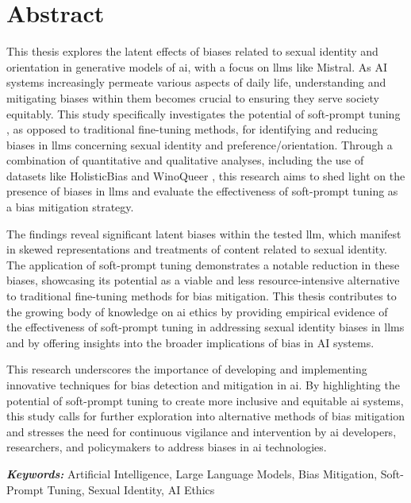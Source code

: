 

\section*{Abstract}
This thesis explores the latent effects of biases related to sexual identity and orientation in generative models of \acrfull{ai}, with a focus on \acrfull{llms} like Mistral. As AI systems increasingly permeate various aspects of daily life, understanding and mitigating biases within them becomes crucial to ensuring they serve society equitably. This study specifically investigates the potential of soft-prompt tuning \citep{prompt-tuning}, as opposed to traditional fine-tuning methods, for identifying and reducing biases in \acrshort{llms} concerning sexual identity and preference/orientation. Through a combination of quantitative and qualitative analyses, including the use of datasets like HolisticBias \citep{holistic} and WinoQueer \citep{winoqueer}, this research aims to shed light on the presence of biases in \acrshort{llms} and evaluate the effectiveness of soft-prompt tuning as a bias mitigation strategy.

The findings reveal significant latent biases within the tested \acrshort{llm}, which manifest in skewed representations and treatments of content related to sexual identity. The application of soft-prompt tuning demonstrates a notable reduction in these biases, showcasing its potential as a viable and less resource-intensive alternative to traditional fine-tuning methods for bias mitigation. This thesis contributes to the growing body of knowledge on \acrshort{ai} ethics by providing empirical evidence of the effectiveness of soft-prompt tuning in addressing sexual identity biases in \acrshort{llms} and by offering insights into the broader implications of bias in AI systems.

This research underscores the importance of developing and implementing innovative techniques for bias detection and mitigation in \acrshort{ai}. By highlighting the potential of soft-prompt tuning to create more inclusive and equitable \acrshort{ai} systems, this study calls for further exploration into alternative methods of bias mitigation and stresses the need for continuous vigilance and intervention by \acrshort{ai} developers, researchers, and policymakers to address biases in \acrshort{ai} technologies.

\vspace{3cm}

\textbf{\textit{Keywords: }}Artificial Intelligence, Large Language Models, Bias Mitigation, Soft-Prompt Tuning, Sexual Identity, AI Ethics

